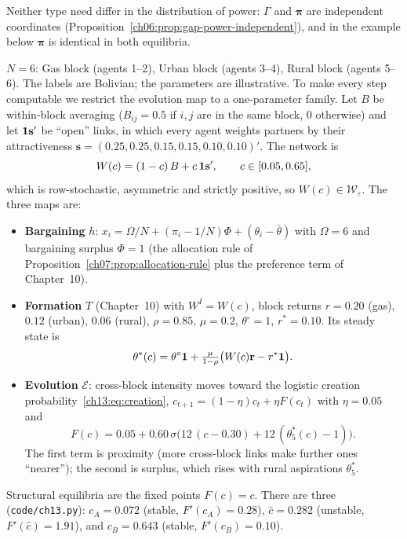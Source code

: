 \documentclass[../structural_economics_book.tex]{subfiles}
\begin{document}
Neither type need differ in the distribution of power: $\Gamma$ and $\boldsymbol{\pi}$ are independent coordinates (Proposition~\ref{ch06:prop:gap-power-independent}), and in the example below $\boldsymbol{\pi}$ is identical in both equilibria.

\begin{example}\label{ch13:ex:bolivia_two}
$N = 6$: Gas block (agents 1--2), Urban block (agents 3--4), Rural block (agents 5--6). The labels are Bolivian; the parameters are illustrative. To make every step computable we restrict the evolution map to a one-parameter family. Let $B$ be within-block averaging ($B_{ij} = 0.5$ if $i, j$ are in the same block, $0$ otherwise) and let $\mathbf{1}\mathbf{s}'$ be ``open'' links, in which every agent weights partners by their attractiveness $\mathbf{s} = (0.25, 0.25, 0.15, 0.15, 0.10, 0.10)'$. The network is
\begin{equation}\label{ch13:eq:Wc}
W(c) = (1-c)\,B + c\,\mathbf{1}\mathbf{s}', \qquad c \in [0.05, 0.65],
\end{equation}
which is row-stochastic, asymmetric and strictly positive, so $W(c) \in \mathcal{W}_\varepsilon$. The three maps are:
\begin{itemize}
\item \textbf{Bargaining} $h$: $x_i = \Omega/N + (\pi_i - 1/N)\Phi + (\theta_i - \bar\theta)$ with $\Omega = 6$ and bargaining surplus $\Phi = 1$ (the allocation rule of Proposition~\ref{ch07:prop:allocation-rule} plus the preference term of Chapter~10).
\item \textbf{Formation} $T$ (Chapter~10) with $W^I = W(c)$, block returns $r = 0.20$ (gas), $0.12$ (urban), $0.06$ (rural), $\rho = 0.85$, $\mu = 0.2$, $\theta^{\circ} = 1$, $r^* = 0.10$. Its steady state is
\[
\theta^*(c) = \theta^{\circ}\mathbf{1} + \tfrac{\mu}{1-\rho}\big(W(c)\mathbf{r} - r^*\mathbf{1}\big).
\]
\item \textbf{Evolution} $\mathcal{E}$: cross-block intensity moves toward the logistic creation probability~\eqref{ch13:eq:creation}, $c_{t+1} = (1-\eta)c_t + \eta F(c_t)$ with $\eta = 0.05$ and
\[
F(c) = 0.05 + 0.60\,\sigma\big(12\,(c - 0.30) + 12\,(\theta^*_{5}(c) - 1)\big).
\]
The first term is proximity (more cross-block links make further ones ``nearer''); the second is surplus, which rises with rural aspirations $\theta^*_5$.
\end{itemize}
Structural equilibria are the fixed points $F(c) = c$. There are three (\texttt{code/ch13.py}): $c_A = 0.072$ (stable, $F'(c_A) = 0.28$), $\hat c = 0.282$ (unstable, $F'(\hat c) = 1.91$), and $c_B = 0.643$ (stable, $F'(c_B) = 0.10$).


\end{example}
\end{document}
